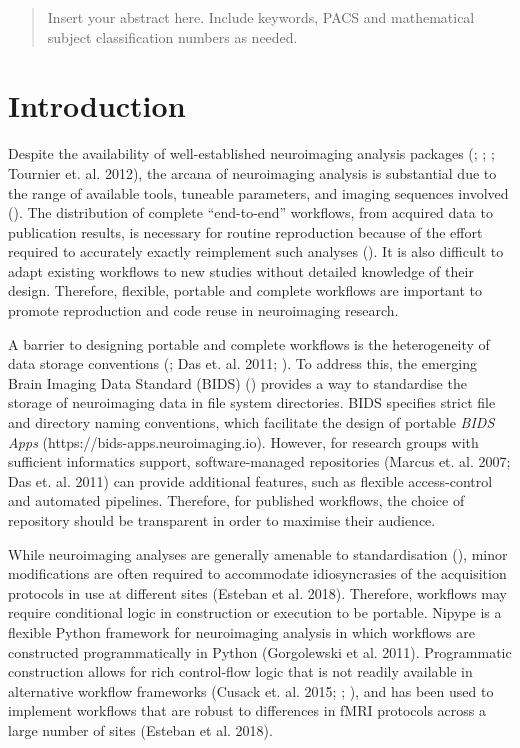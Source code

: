\begin{abstract}
Insert your abstract here. Include keywords, PACS and mathematical
subject classification numbers as needed.
\end{abstract}

\section{Introduction}
\label{intro}

Despite the availability of well-established neuroimaging analysis
packages (\cite{cox_afni:_1996}; \cite{smith_advances_2004}; \cite{friston_statistical_2007};
Tournier et. al. 2012), the arcana of neuroimaging analysis is substantial due to
the range of available tools, tuneable parameters, and imaging sequences
involved (\cite{cusack_automatic_2015}). The distribution of complete
``end-to-end'' workflows, from acquired data to publication results, is
necessary for routine reproduction because of the effort required to
accurately exactly reimplement such analyses (\cite{kennedy_neuroimaging_2018}). It is also
difficult to adapt existing workflows to new studies without detailed
knowledge of their design. Therefore, flexible, portable and complete
workflows are important to promote reproduction and code reuse in
neuroimaging research.

A barrier to designing portable and complete workflows is the
heterogeneity of data storage conventions (\cite{marcus_extensible_2007}; Das et.
al. 2011; \cite{gorgolewski_brain_2016}). To address this, the emerging Brain
Imaging Data Standard (BIDS) (\cite{gorgolewski_brain_2016}) provides a way
to standardise the storage of neuroimaging data in file system
directories. BIDS specifies strict file and directory naming
conventions, which facilitate the design of portable \emph{BIDS Apps}
(https://bids-apps.neuroimaging.io). However, for research groups with
sufficient informatics support, software-managed repositories (Marcus et. al. 2007; Das et. al. 2011) can provide additional features, such as
flexible access-control and automated pipelines. Therefore, for
published workflows, the choice of repository should be transparent in
order to maximise their audience.

While neuroimaging analyses are generally amenable to standardisation
(\cite{kennedy_neuroimaging_2018}), minor modifications are often required to accommodate
idiosyncrasies of the acquisition protocols in use at different sites
(Esteban et al. 2018). Therefore, workflows may require conditional
logic in construction or execution to be portable. Nipype is a flexible
Python framework for neuroimaging analysis in which workflows are
constructed programmatically in Python (Gorgolewski et al. 2011).
Programmatic construction allows for rich control-flow logic that is not
readily available in alternative workflow frameworks (Cusack et. al. 2015; \cite{achterberg_fastr:_2016}; \cite{amstutz_common_2016}), and has been used
to implement workflows that are robust to differences in fMRI protocols
across a large number of sites (Esteban et al. 2018).

